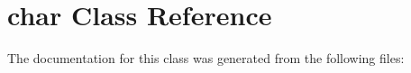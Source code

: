 \hypertarget{classchar}{}\section{char Class Reference}
\label{classchar}


The documentation for this class was generated from the following files\+: